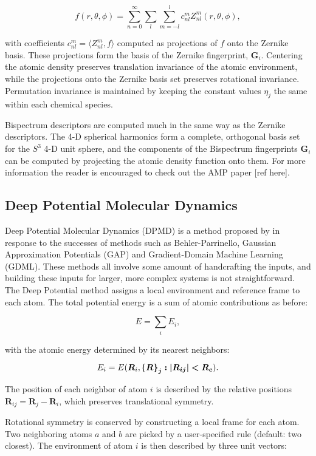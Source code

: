 \begin{equation}
 f(r, \theta, \phi) = \sum_{n=0}^{\infty} \sum_l \sum_{m=-l}^l
    c_{nl}^m Z_{nl}^m (r, \theta, \phi) , 
\end{equation}

with coefficients $c_{nl}^m = \langle Z_{nl}^m, f \rangle$
computed as projections of $f$ onto the Zernike basis.
These projections form the basis of the Zernike fingerprint,
$\bm{G}_i$. Centering the atomic density preserves translation
invariance of the atomic environment, while the projections
onto the Zernike basis set preserves rotational invariance.
Permutation invariance is maintained by keeping the constant values
$\eta_j$ the same within each chemical species.
\par
Bispectrum descriptors are computed much in the same way
as the Zernike descriptors. The 4-D spherical harmonics
form a complete, orthogonal basis set for the $S^3$ 4-D unit
sphere, and the components of the Bispectrum fingerprints
$\bm{G}_i$ can be computed by projecting the atomic
density function onto them. For more information
the reader is encouraged to check out the AMP paper [ref here].

\subsection{Deep Potential Molecular Dynamics}
Deep Potential Molecular Dynamics (DPMD) is a method
proposed by \parencite[Zhang et al.]{PhysRevLett.120.143001}
in response to the successes of methods such as Behler-Parrinello,
Gaussian Approximation Potentials (GAP)
and Gradient-Domain Machine Learning (GDML).
These methods all involve some amount of handcrafting the inputs,
and building these inputs for larger, more complex systems is not
straightforward.
The Deep Potential method assigns a local environment and reference
frame to each atom. The total potential energy is a sum
of atomic contributions as before:

\begin{equation}
 E = \sum_i E_i , 
\end{equation}

with the atomic energy determined by its nearest neighbors:

\begin{equation}
 E_i = E(\bm{R}_i, \left\{\bm{R\right\}_j : \left| \bm{R}_{ij}
    \right| < R_c}) . 
\end{equation}

The position of each neighbor of atom $i$ is described
by the relative positions $\bm{R}_{ij} = \bm{R}_j - \bm{R}_i$,
which preserves translational symmetry.
\par
Rotational symmetry is conserved by constructing a local frame
for each atom. Two neighboring atoms $a$ and $b$ are picked by a
user-specified rule (default: two closest).
The environment of atom $i$ is then described by three unit vectors:

